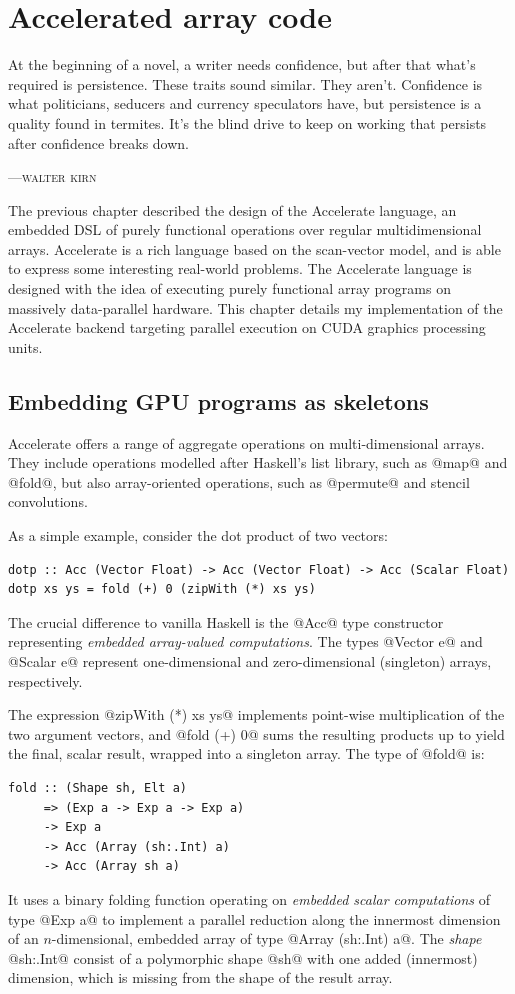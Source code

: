 
\chapter{Accelerated array code}
\label{ch:implementation}

\epigraph{At the beginning of a novel, a writer needs confidence, but after that
what's required is persistence. These traits sound similar. They aren't.
Confidence is what politicians, seducers and currency speculators have, but
persistence is a quality found in termites. It's the blind drive to keep on
working that persists after confidence breaks down.}%
{\textsc{---walter kirn}}


The previous chapter described the design of the Accelerate language, an
embedded DSL of purely functional operations over regular multidimensional
arrays. Accelerate is a rich language based on the scan-vector model, and is
able to express some interesting real-world problems. The Accelerate language is
designed with the idea of executing purely functional array programs on
massively data-parallel hardware. This chapter details my implementation of the
Accelerate backend targeting parallel execution on CUDA graphics processing
units.


\section{Embedding GPU programs as skeletons}
\label{sec:code_generation}

Accelerate offers a range of aggregate operations on multi-dimensional arrays.
They include operations modelled after Haskell's list library, such as
@map@ and @fold@, but also array-oriented operations, such as
@permute@ and stencil convolutions.

As a simple example, consider the dot product of two vectors:
%
\begin{lstlisting}[style=haskell]
dotp :: Acc (Vector Float) -> Acc (Vector Float) -> Acc (Scalar Float)
dotp xs ys = fold (+) 0 (zipWith (*) xs ys)
\end{lstlisting}
%
The crucial difference to vanilla Haskell is the @Acc@ type constructor
representing \emph{embedded array-valued computations}. The types
@Vector e@ and @Scalar e@ represent one-dimensional and
zero-dimensional (singleton) arrays, respectively.

The expression @zipWith (*) xs ys@ implements point-wise multiplication of
the two argument vectors, and @fold (+) 0@ sums the resulting products up
to yield the final, scalar result, wrapped into a singleton array. The type of
@fold@ is:
%
\begin{lstlisting}[style=haskell]
fold :: (Shape sh, Elt a)
     => (Exp a -> Exp a -> Exp a)
     -> Exp a
     -> Acc (Array (sh:.Int) a)
     -> Acc (Array sh a)
\end{lstlisting}
%
It uses a binary folding function operating on \emph{embedded scalar
computations} of type @Exp a@ to implement a parallel reduction along the
innermost dimension of an $n$-dimensional, embedded array of type
@Array (sh:.Int) a@. The \emph{shape} @sh:.Int@ consist of a polymorphic
shape @sh@ with one added (innermost) dimension, which is missing from the shape
of the result array.


